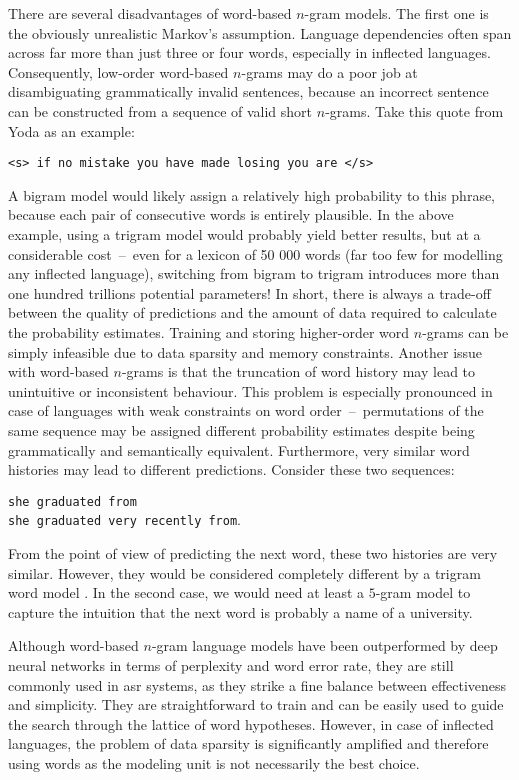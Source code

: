 	There are several disadvantages of \mbox{word-based} \mbox{$n$-gram} models. The first one is the obviously unrealistic Markov's assumption. Language dependencies often span across far more than just three or four words, especially in inflected languages. Consequently, \mbox{low-order} \mbox{word-based} \mbox{$n$-grams} may do a poor job at disambiguating grammatically invalid sentences, because an incorrect sentence can be constructed from a sequence of valid short \mbox{$n$-grams}. Take this quote from Yoda as an example:
	\begin{center}
		\texttt{<s> if no mistake you have made losing you are </s>}
	\end{center}
	A bigram model would likely assign a relatively high probability to this phrase, because each pair of consecutive words is entirely plausible. 
	In the above example, using a trigram model would probably yield better results, but at a considerable cost~--~even for a lexicon of 50 000 words (far too few for modelling any inflected language), switching from bigram to trigram introduces more than one hundred trillions potential parameters! In short, there is always a \mbox{trade-off} between the quality of predictions and the amount of data required to calculate the probability estimates. Training and storing \mbox{higher-order} word \mbox{$n$-grams} can be simply infeasible due to data sparsity and memory constraints.
	Another issue with word-based \mbox{$n$-grams} is that the truncation of word history may lead to unintuitive or inconsistent behaviour. This problem is especially pronounced in case of languages with weak constraints on word order~--~permutations of the same sequence may be assigned different probability estimates despite being grammatically and semantically equivalent. Furthermore, very similar word histories may lead to different predictions. Consider these two sequences:
	\begin{center}
		\texttt{she graduated from} \\
		\texttt{she graduated very recently from}.
	\end{center}
	From the point of view of predicting the next word, these two histories are very similar. However, they would be considered completely different by a trigram word model \cite{whittaker2000statistical}. In the second case, we would need at least a $5$-gram model to capture the intuition that the next word is probably a name of a university.

	Although \mbox{word-based} \mbox{$n$-gram} language models have been outperformed by deep neural networks in terms of perplexity and word error rate, they are still commonly used in \gls{asr} systems, as they strike a fine balance between effectiveness and simplicity. They are straightforward to train and can be easily used to guide the search through the lattice of word hypotheses. However, in case of inflected languages, the problem of data sparsity is significantly amplified and therefore using words as the modeling unit is not necessarily the best choice.
